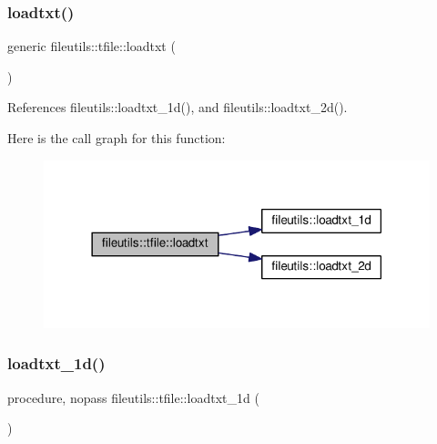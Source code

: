 \subsubsection{\texorpdfstring{loadtxt()}{loadtxt()}}
{\footnotesize\ttfamily generic fileutils\+::tfile\+::loadtxt (\begin{DoxyParamCaption}{ }\end{DoxyParamCaption})\hspace{0.3cm}{\ttfamily [private]}}



References fileutils\+::loadtxt\+\_\+1d(), and fileutils\+::loadtxt\+\_\+2d().

Here is the call graph for this function\+:
\nopagebreak
\begin{figure}[H]
\begin{center}
\leavevmode
\includegraphics[width=318pt]{structfileutils_1_1tfile_a955fbc6ed5aa8dc33c0c46012fe25458_cgraph}
\end{center}
\end{figure}
\mbox{\label{structfileutils_1_1tfile_a8f8225b40d3754ecf00a357196da7f65}} 
\subsubsection{\texorpdfstring{loadtxt\+\_\+1d()}{loadtxt\_1d()}}
{\footnotesize\ttfamily procedure, nopass fileutils\+::tfile\+::loadtxt\+\_\+1d (\begin{DoxyParamCaption}{ }\end{DoxyParamCaption})\hspace{0.3cm}{\ttfamily [private]}}

\mbox{\label{structfileutils_1_1tfile_a045535823c4cdfc8c2fbfc0302d30058}} 
